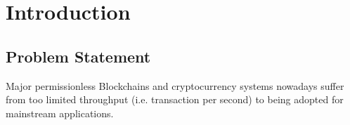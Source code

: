 \chapter{Introduction}
\section{Problem Statement}
Major permissionless Blockchains and cryptocurrency systems \cite{nakamoto2008bitcoin, buterin2014ethereum} nowadays suffer from too limited throughput (i.e. transaction per second) to being adopted for mainstream applications.
